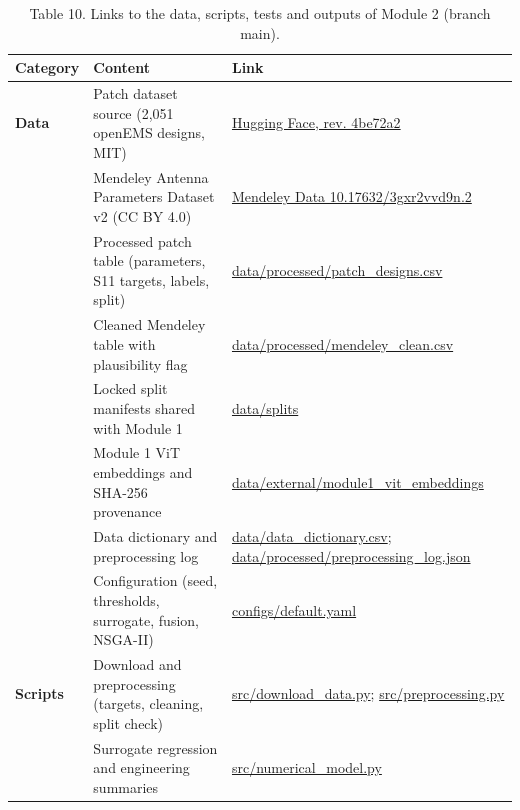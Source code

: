 \documentclass[11pt,a4paper]{article}
\begin{document}
\begin{table}[H]\centering\small
\caption*{Table 10. Links to the data, scripts, tests and outputs of Module 2 (branch main).}
\begin{tabularx}{\linewidth}{XXX}
\toprule
\textbf{Category} & \textbf{Content} & \textbf{Link} \\
\midrule
\textbf{Data} & Patch dataset source (2,051 openEMS designs, MIT) & \href{https://huggingface.co/datasets/becklabash/rectangular-patch-antenna-freq-response}{Hugging Face, rev. 4be72a2} \\
 & Mendeley Antenna Parameters Dataset v2 (CC BY 4.0) & \href{https://doi.org/10.17632/3gxr2vvd9n.2}{Mendeley Data 10.17632/3gxr2vvd9n.2} \\
 & Processed patch table (parameters, S11 targets, labels, split) & \href{https://github.com/rathiabeth-sudo/902---Module-2/blob/main/data/processed/patch_designs.csv}{data/processed/patch\_designs.csv} \\
 & Cleaned Mendeley table with plausibility flag & \href{https://github.com/rathiabeth-sudo/902---Module-2/blob/main/data/processed/mendeley_clean.csv}{data/processed/mendeley\_clean.csv} \\
 & Locked split manifests shared with Module 1 & \href{https://github.com/rathiabeth-sudo/902---Module-2/tree/main/data/splits}{data/splits} \\
 & Module 1 ViT embeddings and SHA-256 provenance & \href{https://github.com/rathiabeth-sudo/902---Module-2/tree/main/data/external/module1_vit_embeddings}{data/external/module1\_vit\_embeddings} \\
 & Data dictionary and preprocessing log & \href{https://github.com/rathiabeth-sudo/902---Module-2/blob/main/data/data_dictionary.csv}{data/data\_dictionary.csv}; \href{https://github.com/rathiabeth-sudo/902---Module-2/blob/main/data/processed/preprocessing_log.json}{data/processed/preprocessing\_log.json} \\
 & Configuration (seed, thresholds, surrogate, fusion, NSGA-II) & \href{https://github.com/rathiabeth-sudo/902---Module-2/blob/main/configs/default.yaml}{configs/default.yaml} \\
\textbf{Scripts} & Download and preprocessing (targets, cleaning, split check) & \href{https://github.com/rathiabeth-sudo/902---Module-2/blob/main/src/download_data.py}{src/download\_data.py}; \href{https://github.com/rathiabeth-sudo/902---Module-2/blob/main/src/preprocessing.py}{src/preprocessing.py} \\
 & Surrogate regression and engineering summaries & \href{https://github.com/rathiabeth-sudo/902---Module-2/blob/main/src/numerical_model.py}{src/numerical\_model.py} \\

\end{tabularx}
\end{table}
\end{document}
